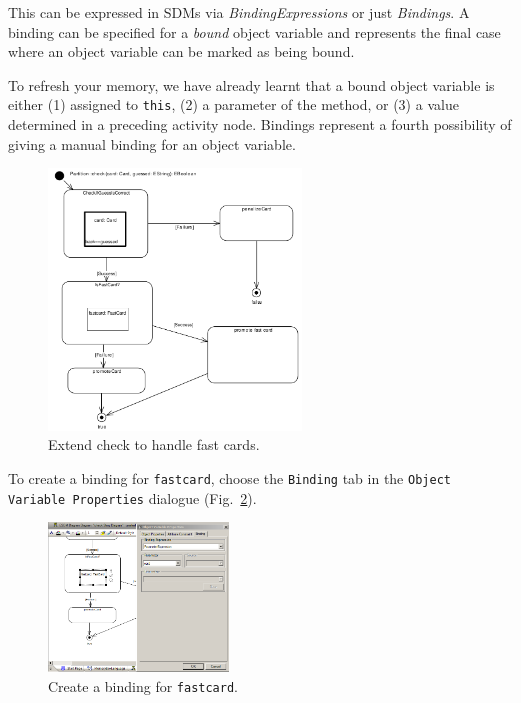 This can be expressed in SDMs via \emph{BindingExpressions} or just
\emph{Bindings}.  A binding can be specified for a \emph{bound} object variable
and represents the final case where an object variable can be marked as being
bound.  

To refresh your memory, we have already learnt that a bound object
variable is either (1) assigned to \texttt{this}, (2) a parameter of the method,
or (3) a value determined in a preceding activity node.  Bindings represent a
fourth possibility of giving a manual binding for an object variable. 

\begin{figure}[htbp]
\begin{center}
  \includegraphics[width=0.6\textwidth]{pics/sdmBilder/bindings/fastcard_controlflow}
  \caption{Extend check to handle fast cards.}  
  \label{fig:sdm_fastcard_2}
\end{center}
\end{figure}

To create a binding for \texttt{fastcard}, choose the \texttt{Binding} tab in
the \texttt{Object Variable Properties} dialogue
(Fig.~\ref{fig:sdm_fastcard_3}). 

\begin{figure}[htbp]
\begin{center}
  \includegraphics[width=0.427\textwidth]{pics/sdmBilder/bindings/fastcard_bindingexp.png}
  \caption{Create a binding for \texttt{fastcard}.}  
  \label{fig:sdm_fastcard_3}
\end{center}
\end{figure}

